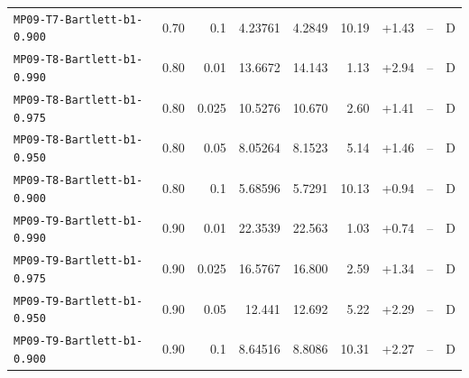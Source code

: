 \begin{longtable}{@{}lrrrrrrrc@{}}
\texttt{MP09-T7-Bartlett-b1-0.900} & 0.70 & 0.1 & 4.23761 & 4.2849 & 10.19 & +1.43 & -- & D\\
\texttt{MP09-T8-Bartlett-b1-0.990} & 0.80 & 0.01 & 13.6672 & 14.143 & 1.13 & +2.94 & -- & D\\
\texttt{MP09-T8-Bartlett-b1-0.975} & 0.80 & 0.025 & 10.5276 & 10.670 & 2.60 & +1.41 & -- & D\\
\texttt{MP09-T8-Bartlett-b1-0.950} & 0.80 & 0.05 & 8.05264 & 8.1523 & 5.14 & +1.46 & -- & D\\
\texttt{MP09-T8-Bartlett-b1-0.900} & 0.80 & 0.1 & 5.68596 & 5.7291 & 10.13 & +0.94 & -- & D\\
\texttt{MP09-T9-Bartlett-b1-0.990} & 0.90 & 0.01 & 22.3539 & 22.563 & 1.03 & +0.74 & -- & D\\
\texttt{MP09-T9-Bartlett-b1-0.975} & 0.90 & 0.025 & 16.5767 & 16.800 & 2.59 & +1.34 & -- & D\\
\texttt{MP09-T9-Bartlett-b1-0.950} & 0.90 & 0.05 & 12.441 & 12.692 & 5.22 & +2.29 & -- & D\\
\texttt{MP09-T9-Bartlett-b1-0.900} & 0.90 & 0.1 & 8.64516 & 8.8086 & 10.31 & +2.27 & -- & D\\
\end{longtable}
